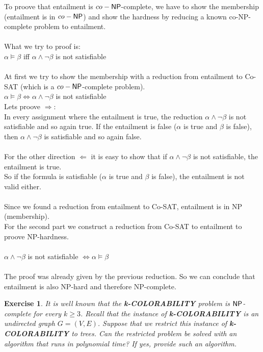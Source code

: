 \documentclass [11pt]{article}
\newtheorem{exercise}[theorem]{Exercise}
\newcommand{\ccfont}[1]{\protect\mathsf{#1}}
\newcommand{\NP}{\ccfont{NP}}
\newcommand{\solution}[1]{\noindent {\bf Solution.}  #1}
\begin{document}
\solution
To proove that entailment is $co-\NP$-complete, we have to show the membership (entailment is in $co-\NP$) 
and show the hardness by reducing a known co-NP-complete problem to entailment.\\
\\
What we try to proof is:\\
$\alpha \vDash \beta$ iff $\alpha \wedge \neg\beta$ is not satisfiable\\
\\
At first we try to show the membership with a reduction from entailment to Co-SAT (which is a $co-\NP$-complete problem).\\
$\alpha \vDash \beta \Leftrightarrow \alpha \wedge \neg\beta$ is not satisfiable\\
Lets proove $\Rightarrow$:\\
In every assignment where the entailment is true, the reduction $\alpha \wedge \neg\beta$ is not satisfiable and so again true.
If the entailment is false ($\alpha$ is true and $\beta$ is false), then $\alpha \wedge \neg\beta$ is satisfiable and so again false.\\
\\
For the other direction $\Leftarrow$ it is easy to show that if $\alpha \wedge \neg\beta$ is not satisfiable, the entailment is true.\\
So if the formula is satisfiable ($\alpha$ is true and $\beta$ is false), the entailment is not valid either.\\
\\
Since we found a reduction from entailment to Co-SAT, entailment is in NP (membership).
\\
For the second part we construct a reduction from Co-SAT to entailment to proove NP-hardness.\\
\\
$\alpha \wedge \neg\beta$ is not satisfiable $\Leftrightarrow \alpha \vDash \beta$\\
\\
The proof was already given by the previous reduction. So we can conclude that entailment is also NP-hard and therefore NP-complete.


\begin{exercise}
  \label{ex:Colors}
  It is well known that the \textbf{k-COLORABILITY} problem is $\NP$-complete for every $k \geq 3$. Recall that the instance of \textbf{k-COLORABILITY} is an undirected graph $G = (V, E)$. Suppose that we restrict this instance of \textbf{k-COLORABILITY} to trees. Can the restricted problem be solved with an algorithm that runs in polynomial time? If yes, provide such an algorithm. 
\end{exercise}
\end{document}
